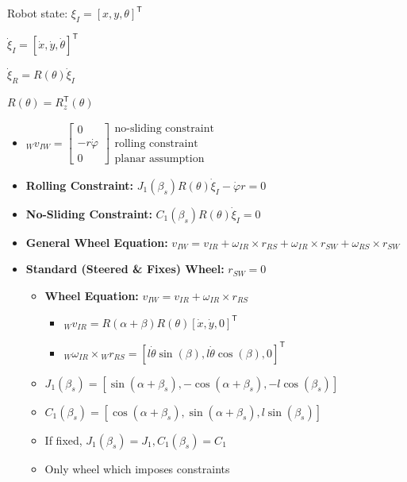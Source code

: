\documentclass[a4paper]{article}
\newcommand{\ides}[1]{\item \textbf{#1}}
\newcommand{\transpose}{\mathsf{T}}
\begin{document}
\begin{itemize*}
    \item Robot state: $\xi_I = [x, y, \theta]^\transpose$
    \item $\dot \xi_I = [\dot x, \dot y, \dot \theta]^\transpose$
    \item $\dot \xi_R = R(\theta) \dot \xi_I$
    \item $R(\theta) = R^\transpose_z(\theta)$
\end{itemize*}
\begin{itemize}
    \item ${}_W v_{IW} =
        \begin{bmatrix}
            0\\
            -r \dot \varphi\\
            0
        \end{bmatrix}
        \begin{matrix}
            \text{no-sliding constraint}\\
            \text{rolling constraint}\\
            \text{planar assumption}
        \end{matrix}$
    \ides{Rolling Constraint:} $J_1(\beta_s) R(\theta) \dot \xi_I - \dot \varphi r = 0$
    \ides{No-Sliding Constraint:} $C_1(\beta_s) R(\theta) \dot \xi_I = 0$
    \ides{General Wheel Equation:} $v_{IW} = v_{IR} + \omega_{IR} \times r_{RS} + \omega_{IR} \times r_{SW} + \omega_{RS} \times r_{SW}$
    \ides{Standard (Steered \& Fixes) Wheel:} $r_{SW} = 0$
        \begin{itemize}
            \ides{Wheel Equation:} $v_{IW} = v_{IR} + \omega_{IR} \times r_{RS}$
                \begin{itemize}
                    \item ${}_W v_{IR} = R(\alpha + \beta) R(\theta)[\dot x, \dot y, 0]^\transpose$
                    \item ${}_W \omega_{IR} \times {}_W r_{RS} = [l \dot \theta \sin(\beta), l \dot \theta \cos(\beta), 0]^\transpose$
                \end{itemize}
            \item $J_1(\beta_s) = [\sin(\alpha + \beta_s), -\cos(\alpha + \beta_s), -l \cos(\beta_s)]$
            \item $C_1(\beta_s) = [\cos(\alpha + \beta_s), \sin(\alpha + \beta_s), l \sin(\beta_s)]$
            \item If fixed, $J_1(\beta_s) = J_1, C_1(\beta_s) = C_1$
            \item Only wheel which imposes constraints

\end{itemize}
\end{itemize}
\end{document}
